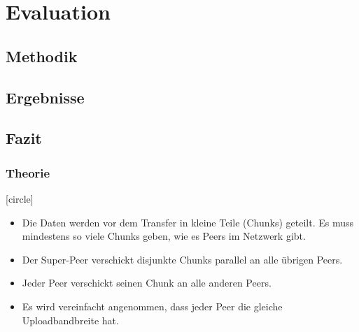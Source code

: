 
\section{Evaluation}

\subsection{Methodik}
\subsection{Ergebnisse}
\subsection{Fazit}

\begin{frame}
  \frametitle{Theorie}

  [circle]
  \begin{itemize}  
    \item Die Daten werden vor dem Transfer in kleine Teile (Chunks) geteilt. Es muss mindestens so viele Chunks geben, wie es Peers im Netzwerk gibt.

    \item Der Super-Peer verschickt disjunkte Chunks parallel an alle übrigen Peers.

    \item Jeder Peer verschickt seinen Chunk an alle anderen Peers.

    \item Es wird vereinfacht angenommen, dass jeder Peer die gleiche Uploadbandbreite hat.
  \end{itemize}	

\end{frame}

